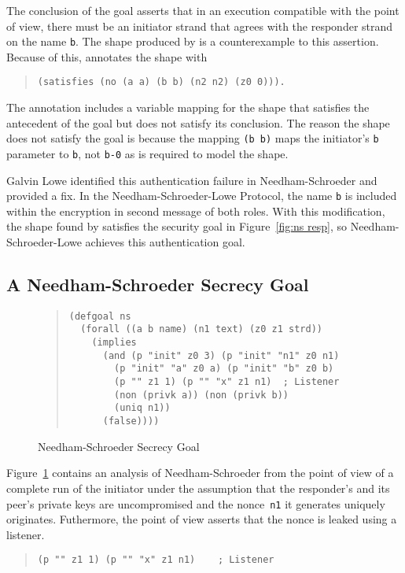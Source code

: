 \documentclass[12pt]{article}
\begin{document}
The conclusion of the goal asserts that in an execution compatible
with the point of view, there must be an initiator strand that agrees
with the responder strand on the name \texttt{b}.  The shape produced
by {\cpsa} is a counterexample to this assertion.  Because of this,
{\cpsa} annotates the shape with
\begin{quote}
\begin{verbatim}
(satisfies (no (a a) (b b) (n2 n2) (z0 0))).
\end{verbatim}
\end{quote}
The annotation includes a variable mapping for the shape that
satisfies the antecedent of the goal but does not satisfy its
conclusion.  The reason the shape does not satisfy the goal is because
the mapping \texttt{(b b)} maps the initiator's \texttt{b} parameter
to \texttt{b}, not \texttt{b-0} as is required to model the shape.

Galvin Lowe identified this authentication failure in
Needham-Schroeder and provided a fix.  In the Needham-Schroeder-Lowe
Protocol, the name \texttt{b} is included within the encryption in second
message of both roles.  With this modification, the shape found by
{\cpsa} satisfies the security goal in Figure~\ref{fig:ns resp}, so
Needham-Schroeder-Lowe achieves this authentication goal.

\subsection{A Needham-Schroeder Secrecy Goal}\label{sec:secrecy goal}

\begin{figure}
\begin{quote}
\begin{verbatim}
(defgoal ns
  (forall ((a b name) (n1 text) (z0 z1 strd))
    (implies
      (and (p "init" z0 3) (p "init" "n1" z0 n1)
        (p "init" "a" z0 a) (p "init" "b" z0 b)
        (p "" z1 1) (p "" "x" z1 n1)  ; Listener
        (non (privk a)) (non (privk b))
        (uniq n1))
      (false))))
\end{verbatim}
\end{quote}
\caption{Needham-Schroeder Secrecy Goal}\label{fig:ns secrecy}
\end{figure}

Figure~\ref{fig:ns secrecy} contains an analysis of Needham-Schroeder
from the point of view of a complete run of the initiator under the
assumption that the responder's and its peer's private keys are
uncompromised and the nonce~\texttt{n1} it generates uniquely
originates.  Futhermore, the point of view asserts that the nonce is
leaked using a listener.
\begin{quote}
\begin{verbatim}
(p "" z1 1) (p "" "x" z1 n1)    ; Listener
\end{verbatim}
\end{quote}
\end{document}
